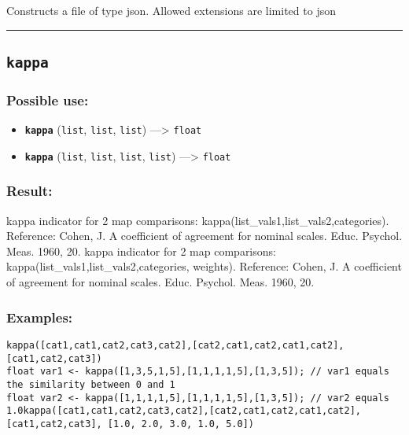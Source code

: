 \documentclass[]{book}
\providecommand{\tightlist}{%
  \setlength{\itemsep}{0pt}\setlength{\parskip}{0pt}}
\theoremstyle{definition}
\theoremstyle{definition}
\theoremstyle{definition}
\theoremstyle{remark}
\begin{document}
Constructs a file of type json. Allowed extensions are limited to json

\begin{center}\rule{0.5\linewidth}{\linethickness}\end{center}

\subsection{\texorpdfstring{\texttt{kappa}}{kappa}}\label{kappa}

\subsubsection{Possible use:}\label{possible-use-311}

\begin{itemize}
\tightlist
\item
  \textbf{\texttt{kappa}} (\texttt{list}, \texttt{list}, \texttt{list})
  ---\textgreater{} \texttt{float}
\item
  \textbf{\texttt{kappa}} (\texttt{list}, \texttt{list}, \texttt{list},
  \texttt{list}) ---\textgreater{} \texttt{float}
\end{itemize}

\subsubsection{Result:}\label{result-301}

kappa indicator for 2 map comparisons:
kappa(list\_vals1,list\_vals2,categories). Reference: Cohen, J. A
coefficient of agreement for nominal scales. Educ. Psychol. Meas. 1960,
20. kappa indicator for 2 map comparisons:
kappa(list\_vals1,list\_vals2,categories, weights). Reference: Cohen, J.
A coefficient of agreement for nominal scales. Educ. Psychol. Meas.
1960, 20.

\subsubsection{Examples:}\label{examples-218}

\begin{verbatim}
kappa([cat1,cat1,cat2,cat3,cat2],[cat2,cat1,cat2,cat1,cat2],[cat1,cat2,cat3])  
float var1 <- kappa([1,3,5,1,5],[1,1,1,1,5],[1,3,5]); // var1 equals the similarity between 0 and 1 
float var2 <- kappa([1,1,1,1,5],[1,1,1,1,5],[1,3,5]); // var2 equals 1.0kappa([cat1,cat1,cat2,cat3,cat2],[cat2,cat1,cat2,cat1,cat2],[cat1,cat2,cat3], [1.0, 2.0, 3.0, 1.0, 5.0]) 
\end{verbatim}
\end{document}
